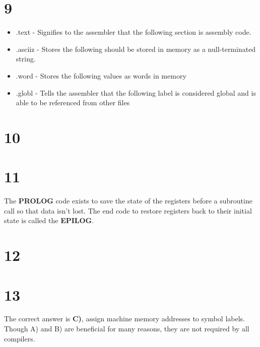 \documentclass[a4paper,11pt]{article}
\begin{document}

\section*{9}
\begin{itemize}
    \item .text - Signifies to the assembler that the following section is assembly code.
    \item .asciiz - Stores the following should be stored in memory as a null-terminated string.
    \item .word - Stores the following values as words in memory
    \item .globl - Tells the assembler that the following label is considered global and is able to be referenced from other files
\end{itemize}



\section*{10}


\section*{11}
The {\bf PROLOG} code exists to save the state of the registers before a subroutine call so that data isn't lost.  The end code to restore registers back to their initial state is called the {\bf EPILOG}.


\section*{12}


\section*{13}
The correct answer is {\bf C)}, assign machine memory addresses to symbol labels.  Though A) and B) are beneficial for many reasons, they are not required by all compilers.  
\end{document}
